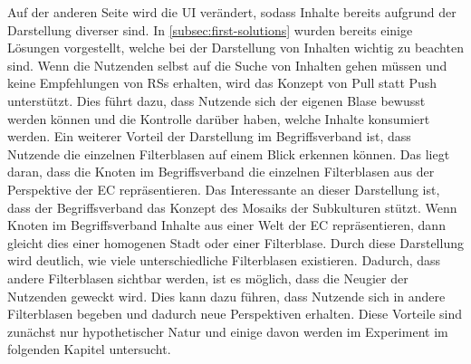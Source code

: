 Auf der anderen Seite wird die \ac{UI} verändert, sodass Inhalte bereits aufgrund der Darstellung diverser sind.
In \autoref{subsec:first-solutions} wurden bereits einige Lösungen vorgestellt, welche bei der Darstellung von Inhalten wichtig zu beachten sind.
Wenn die Nutzenden selbst auf die Suche von Inhalten gehen müssen und keine Empfehlungen von \acp{RS} erhalten, wird das Konzept von Pull statt Push unterstützt.
Dies führt dazu, dass Nutzende sich der eigenen Blase bewusst werden können und die Kontrolle darüber haben, welche Inhalte konsumiert werden.
Ein weiterer Vorteil der Darstellung im Begriffsverband ist, dass Nutzende die einzelnen Filterblasen auf einem Blick erkennen können.
Das liegt daran, dass die Knoten im Begriffsverband die einzelnen Filterblasen aus der Perspektive der \ac{EC} repräsentieren.
Das Interessante an dieser Darstellung ist, dass der Begriffsverband das Konzept des Mosaiks der Subkulturen stützt.
Wenn Knoten im Begriffsverband Inhalte aus einer Welt der \ac{EC} repräsentieren, dann gleicht dies einer homogenen Stadt oder einer Filterblase.
Durch diese Darstellung wird deutlich, wie viele unterschiedliche Filterblasen existieren.
Dadurch, dass andere Filterblasen sichtbar werden, ist es möglich, dass die Neugier der Nutzenden geweckt wird.
Dies kann dazu führen, dass Nutzende sich in andere Filterblasen begeben und dadurch neue Perspektiven erhalten.
Diese Vorteile sind zunächst nur hypothetischer Natur und einige davon werden im Experiment im folgenden Kapitel untersucht.
